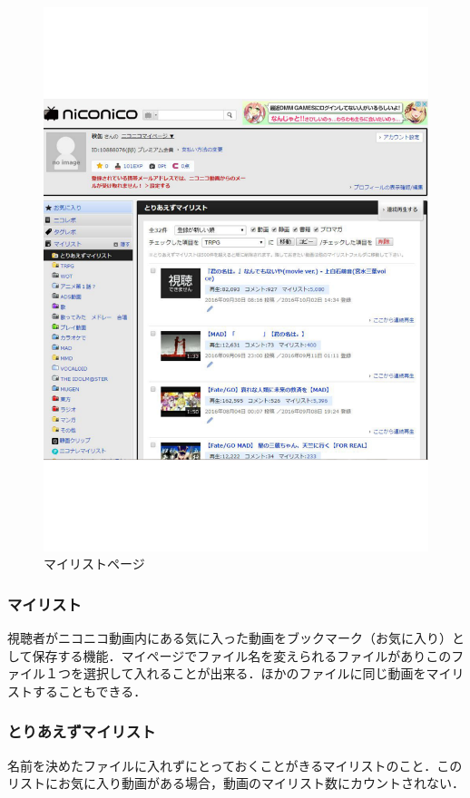 \begin{figure}[htb]
\centering
\includegraphics[width=14cm]{mairisuto.pdf}
\caption{マイリストページ}\label{mairisu}
\end{figure}


\clearpage
\subsubsection*{マイリスト}
視聴者がニコニコ動画内にある気に入った動画をブックマーク（お気に入り）として保存する機能．マイページでファイル名を変えられるファイルがありこのファイル１つを選択して入れることが出来る．ほかのファイルに同じ動画をマイリストすることもできる．

\subsubsection*{とりあえずマイリスト}
名前を決めたファイルに入れずにとっておくことがきるマイリストのこと．このリストにお気に入り動画がある場合，動画のマイリスト数にカウントされない．

